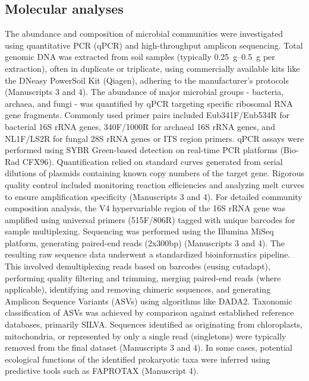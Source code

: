 \subsection{Molecular analyses}

The abundance and composition of microbial communities were investigated using quantitative PCR (qPCR) and high-throughput amplicon sequencing. Total genomic DNA was extracted from soil samples (typically \SIrange[range-phrase=--,range-units=single]{0.25}{0.5}{\gram} per extraction), often in duplicate or triplicate, using commercially available kits like the DNeasy PowerSoil Kit (Qiagen), adhering to the manufacturer's protocols (Manuscripts 3 and 4). The abundance of major microbial groups - bacteria, archaea, and fungi - was quantified by qPCR targeting specific ribosomal RNA gene fragments. Commonly used primer pairs included Eub341F/Eub534R for bacterial 16S rRNA genes, 340F/1000R for archaeal 16S rRNA genes, and NL1F/LS2R for fungal 28S rRNA genes or ITS region primers. qPCR assays were performed using SYBR Green-based detection on real-time PCR platforms (Bio-Rad CFX96). Quantification relied on standard curves generated from serial dilutions of plasmids containing known copy numbers of the target gene. Rigorous quality control included monitoring reaction efficiencies and analyzing melt curves to ensure amplification specificity (Manuscripts 3 and 4). For detailed community composition analysis, the V4 hypervariable region of the 16S rRNA gene was amplified using universal primers (515F/806R) \citep{Apprill2015, Parada2016} tagged with unique barcodes for sample multiplexing. Sequencing was performed using the Illumina MiSeq platform, generating paired-end reads (2x300bp) (Manuscripts 3 and 4). The resulting raw sequence data underwent a standardized bioinformatics pipeline. This involved demultiplexing reads based on barcodes (eusing cutadapt), performing quality filtering and trimming, merging paired-end reads (where applicable), identifying and removing chimeric sequences, and generating Amplicon Sequence Variants (ASVs) using algorithms like DADA2. Taxonomic classification of ASVs was achieved by comparison against established reference databases, primarily SILVA. Sequences identified as originating from chloroplasts, mitochondria, or represented by only a single read (singletons) were typically removed from the final dataset (Manuscripts 3 and 4). In some cases, potential ecological functions of the identified prokaryotic taxa were inferred using predictive tools such as FAPROTAX (Manuscript 4).

